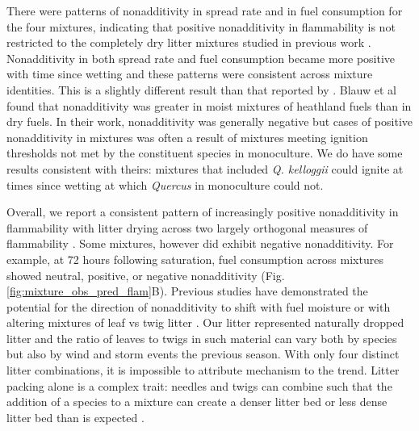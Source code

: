 \documentclass[letterpaper,12pt]{article}
\begin{document}
There were patterns of nonadditivity in spread rate and in fuel consumption for
the four mixtures, indicating that positive nonadditivity in flammability is
not restricted to the completely dry litter mixtures studied in previous work
\citep{Magalhaes+Schwilk-2012, VanAltena+Logtestjin+etal-2012}. Nonadditivity
in both spread rate and fuel consumption became more positive with time since
wetting and these patterns were consistent across mixture identities. This is a
slightly different result than that reported by
\citet{Blauw+Wensink+etal-2015}. Blauw et al found that nonadditivity was
greater in moist mixtures of heathland fuels than in dry fuels. In their work,
nonadditivity was generally negative but cases of positive nonadditivity in
mixtures was often a result of mixtures meeting ignition thresholds not met by
the constituent species in monoculture. We do have some results consistent with
theirs: mixtures that included \emph{Q. kelloggii} could ignite at times since
wetting at which \emph{Quercus} in monoculture could not.

Overall, we report a consistent pattern of increasingly positive nonadditivity
in flammability with litter drying across two largely orthogonal measures of
flammability \citep{Schwilk-2015, Pausas+Keeley+etal-2017,
  Prior+Murphy+etal-2018}. Some mixtures, however did exhibit negative
nonadditivity. For example, at 72 hours following saturation, fuel consumption
across mixtures showed neutral, positive, or negative nonadditivity (Fig.
\ref{fig:mixture_obs_pred_flam}B). Previous studies have demonstrated the
potential for the direction of nonadditivity to shift with fuel moisture
\citep{Blauw+Wensink+etal-2015} or with altering mixtures of leaf vs twig
litter \citep{Zhao+vanLogtestijn+etal-2019}. Our litter represented naturally
dropped litter and the ratio of leaves to twigs in such material can vary both
by species but also by wind and storm events the previous season. With only
four distinct litter combinations, it is impossible to attribute mechanism to
the trend. Litter packing alone is a complex trait: needles and twigs can
combine such that the addition of a species to a mixture can create a denser
litter bed or less dense litter bed than is expected
\citep{Zhao+vanLogtestijn+etal-2019}.
\end{document}
